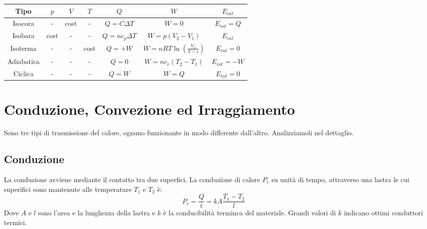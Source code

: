             
            \begin{tabular}{ |c|c|c|c|c|c|c| } 
                \hline
                    \textbf{Tipo} & $p$ & $V$ & $T$ & $Q$ & $W$ & $E_{int}$ \\
                \hline
                    Isocora 
                        & - 
                        & cost 
                        & - 
                        & $Q = C\Delta T$ 
                        & $W = 0$
                        & $E_{int} = Q$ \\
                \hline
                    Isobara
                        & cost
                        & - 
                        & - 
                        & $Q = nc_p\Delta T$
                        & $W = p(V_2 - V_1)$
                        & $E_{int}$ \\
                \hline
                    Isoterma
                        & -
                        & - 
                        & cost
                        & $Q = + W$
                        & $W = nRT\ln(\frac{V_f}{V-i})$
                        & $E_{int} = 0$ \\
                \hline
                    Adiabatica
                        & -
                        & - 
                        & -
                        & $Q = 0$
                        & $W = nc_v(T_2 - T_1)$
                        & $E_{int} = -W$ \\
                \hline
                    Ciclica
                        & -
                        & - 
                        & -
                        & $Q = W$
                        & $W = Q$
                        & $E_{int} = 0$ \\
                \hline
            \end{tabular}
            

        \section{Conduzione, Convezione ed Irraggiamento} Sono tre tipi di 
        trasmissione del calore, ognuno funzionante in modo differente 
        dall'altro. Analizziamoli nel dettaglio.

            \subsection{Conduzione} La conduzione avviene mediante il contatto
            tra due superfici. La conduzione di calore $P_c$ su unità di tempo,
            attraverso una lastra le cui superifici sono mantenute alle 
            temperature $T_1$ e $T_2$ è:
                \begin{equation}
                    P_c = \frac{Q}{t} = kA\frac{T_1 - T_2}{l}
                \end{equation}
            Dove $A$ e $l$ sono l'area e la lunghezza della lastra e $k$ è la 
            conducibilità terminca del materiale. Grandi valori di $k$ indicano
            ottimi conduttori termici.

